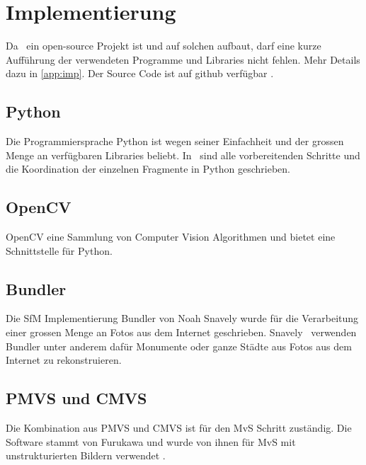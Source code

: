 	\section{Implementierung}  \label{imp:tech}
		Da \dronarch\ ein open-source Projekt ist und auf solchen aufbaut, darf eine kurze Aufführung der verwendeten Programme und Libraries nicht fehlen. Mehr Details dazu in \autoref{app:imp}. Der Source Code ist auf github verfügbar .
		
		\subsection{Python}
			Die Programmiersprache Python  ist wegen seiner Einfachheit und der grossen Menge an verfügbaren Libraries beliebt.
			In \dronarch\ sind alle vorbereitenden Schritte und die Koordination der einzelnen Fragmente in Python geschrieben.
			
		\subsection{OpenCV}
			OpenCV  eine Sammlung von Computer Vision Algorithmen und bietet eine Schnittstelle für Python.
						
		\subsection{Bundler}
			Die SfM Implementierung Bundler  von Noah Snavely wurde für die Verarbeitung einer grossen Menge an Fotos aus dem Internet geschrieben. Snavely \etal\ verwenden Bundler unter anderem dafür Monumente  oder ganze Städte  aus Fotos aus dem Internet zu rekonstruieren.

		\subsection{PMVS und CMVS}
			Die Kombination aus PMVS  und CMVS  ist für den MvS Schritt zuständig. Die Software stammt von Furukawa \etal {} und wurde von ihnen für MvS mit unstrukturierten Bildern verwendet .
		